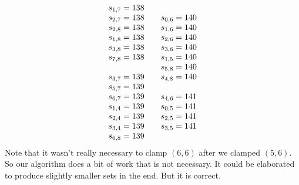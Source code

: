 \documentclass[letterpaper]{article} %
\theoremstyle{definition}
\begin{document}
\[\begin{array}[t]{lllll}
\begin{array}{l}
s_{1, 7} = 138 \\
s_{2, 7} = 138 \\
s_{2, 8} = 138 \\
s_{1, 8} = 138 \\
s_{3, 8} = 138 \\
s_{7, 8} = 138 \\
\\
s_{3, 7} = 139 \\
s_{5, 7} = 139 \\
s_{6, 7} = 139 \\
s_{1, 4} = 139 \\
s_{2, 4} = 139 \\
s_{3, 4} = 139 \\
s_{6, 8} = 139 \\
   \end{array}
 &
  \begin{array}{l}
s_{0, 6} = 140 \\
s_{1, 6} = 140 \\
s_{2, 6} = 140 \\
s_{3, 6} = 140 \\
s_{1, 5} = 140 \\
s_{5, 8} = 140 \\
s_{4, 8} = 140 \\
\\
s_{4, 6} = 141 \\
s_{0, 5} = 141 \\
s_{2, 5} = 141 \\
s_{3, 5} = 141 \\
\end{array}
\end{array}
\]
Note that it wasn't really necessary to clamp $(6,6)$ after we clamped $(5,6)$.
So our algorithm does a bit of work that is not necessary.   
It could be elaborated to produce slightly smaller sets in the end.  But it is correct.
\end{document}
